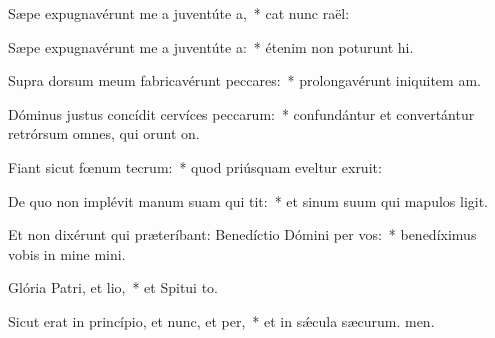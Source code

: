 \item Sæpe expugnavérunt me a juventúte a,~* cat nunc raël:
\item Sæpe expugnavérunt me a juventúte a:~* étenim non poturunt hi.
\item Supra dorsum meum fabricavérunt peccares:~* prolongavérunt iniquitem am.
\item Dóminus justus concídit cervíces peccarum:~* confundántur et convertántur retrórsum omnes, qui orunt on.
\item Fiant sicut fœnum tecrum:~* quod priúsquam eveltur exruit:
\item De quo non implévit manum suam qui tit:~* et sinum suum qui mapulos ligit.
\item Et non dixérunt qui præteríbant: Benedíctio Dómini per vos:~* benedíximus vobis in mine mini.
\item Glória Patri, et lio,~* et Spitui to.
\item Sicut erat in princípio, et nunc, et per,~* et in sǽcula sæcurum. men.
